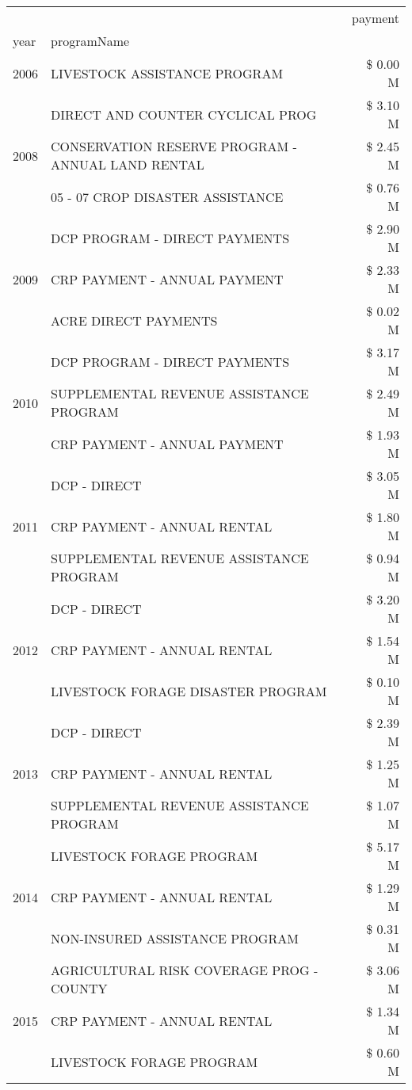 \begin{tabular}{llr}
\toprule
 &  & payment \\
year & programName &  \\
\midrule
2006 & LIVESTOCK ASSISTANCE PROGRAM & \$ 0.00 M \\
\cline{1-3}
\multirow[t]{3}{*}{2008} & DIRECT AND COUNTER CYCLICAL PROG & \$ 3.10 M \\
 & CONSERVATION RESERVE PROGRAM - ANNUAL LAND RENTAL & \$ 2.45 M \\
 & 05 - 07 CROP DISASTER ASSISTANCE & \$ 0.76 M \\
\cline{1-3}
\multirow[t]{3}{*}{2009} & DCP PROGRAM - DIRECT PAYMENTS & \$ 2.90 M \\
 & CRP PAYMENT - ANNUAL PAYMENT & \$ 2.33 M \\
 & ACRE DIRECT PAYMENTS & \$ 0.02 M \\
\cline{1-3}
\multirow[t]{3}{*}{2010} & DCP PROGRAM - DIRECT PAYMENTS & \$ 3.17 M \\
 & SUPPLEMENTAL REVENUE ASSISTANCE PROGRAM & \$ 2.49 M \\
 & CRP PAYMENT - ANNUAL PAYMENT & \$ 1.93 M \\
\cline{1-3}
\multirow[t]{3}{*}{2011} & DCP - DIRECT & \$ 3.05 M \\
 & CRP PAYMENT - ANNUAL RENTAL & \$ 1.80 M \\
 & SUPPLEMENTAL REVENUE ASSISTANCE PROGRAM & \$ 0.94 M \\
\cline{1-3}
\multirow[t]{3}{*}{2012} & DCP - DIRECT & \$ 3.20 M \\
 & CRP PAYMENT - ANNUAL RENTAL & \$ 1.54 M \\
 & LIVESTOCK FORAGE DISASTER PROGRAM & \$ 0.10 M \\
\cline{1-3}
\multirow[t]{3}{*}{2013} & DCP - DIRECT & \$ 2.39 M \\
 & CRP PAYMENT - ANNUAL RENTAL & \$ 1.25 M \\
 & SUPPLEMENTAL REVENUE ASSISTANCE PROGRAM & \$ 1.07 M \\
\cline{1-3}
\multirow[t]{3}{*}{2014} & LIVESTOCK FORAGE PROGRAM & \$ 5.17 M \\
 & CRP PAYMENT - ANNUAL RENTAL & \$ 1.29 M \\
 & NON-INSURED ASSISTANCE PROGRAM & \$ 0.31 M \\
\cline{1-3}
\multirow[t]{3}{*}{2015} & AGRICULTURAL RISK COVERAGE PROG - COUNTY & \$ 3.06 M \\
 & CRP PAYMENT - ANNUAL RENTAL & \$ 1.34 M \\
 & LIVESTOCK FORAGE PROGRAM & \$ 0.60 M \\

\end{tabular}
